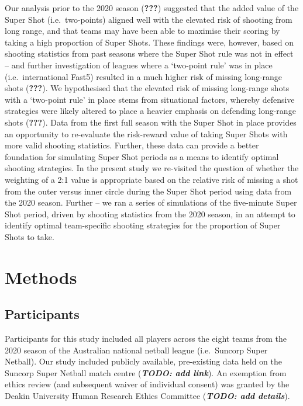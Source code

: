 \documentclass[]{elsarticle} %
\begin{document}
Our analysis prior to the 2020 season ({\textbf{???}}) suggested that
the added value of the Super Shot (i.e.~two-points) aligned well with
the elevated risk of shooting from long range, and that teams may have
been able to maximise their scoring by taking a high proportion of Super
Shots. These findings were, however, based on shooting statistics from
past seasons where the Super Shot rule was not in effect -- and further
investigation of leagues where a `two-point rule' was in place
(i.e.~international Fast5) resulted in a much higher risk of missing
long-range shots ({\textbf{???}}). We hypothesised that the elevated
risk of missing long-range shots with a `two-point rule' in place stems
from situational factors, whereby defensive strategies were likely
altered to place a heavier emphasis on defending long-range shots
({\textbf{???}}). Data from the first full season with the Super Shot in
place provides an opportunity to re-evaluate the risk-reward value of
taking Super Shots with more valid shooting statistics. Further, these
data can provide a better foundation for simulating Super Shot periods
as a means to identify optimal shooting strategies. In the present study
we re-visited the question of whether the weighting of a 2:1 value is
appropriate based on the relative risk of missing a shot from the outer
versus inner circle during the Super Shot period using data from the
2020 season. Further -- we ran a series of simulations of the
five-minute Super Shot period, driven by shooting statistics from the
2020 season, in an attempt to identify optimal team-specific shooting
strategies for the proportion of Super Shots to take.

\hypertarget{methods}{%
\section{Methods}\label{methods}}

\hypertarget{participants}{%
\subsection{Participants}\label{participants}}

Participants for this study included all players across the eight teams
from the 2020 season of the Australian national netball league
(i.e.~Suncorp Super Netball). Our study included publicly available,
pre-existing data held on the Suncorp Super Netball match centre
(\textbf{\emph{TODO: add link}}). An exemption from ethics review (and
subsequent waiver of individual consent) was granted by the Deakin
University Human Research Ethics Committee (\textbf{\emph{TODO: add
details}}).
\end{document}
